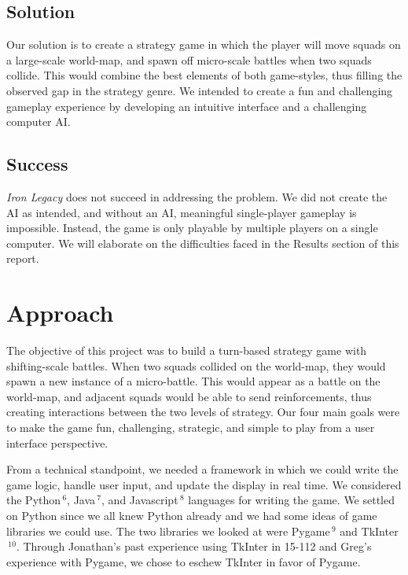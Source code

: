 \documentclass{article}
\begin{document}
\subsection*{Solution}
Our solution is to create a strategy game in which the player will move squads
on a large-scale world-map, and spawn off micro-scale battles when two squads
collide.
This would combine the best elements of both game-styles,
thus filling the observed gap in the strategy genre.
We intended to create a fun and challenging gameplay experience by developing
an intuitive interface and a challenging computer AI.

\subsection*{Success}
\emph{Iron Legacy} does not succeed in addressing the problem.
We did not create the AI as intended, and without an AI, meaningful 
single-player gameplay is impossible.
Instead, the game is only playable by multiple players on a single computer.
We will elaborate on the difficulties faced in the Results section of this
report.

\section*{Approach}
The objective of this project was to build a turn-based strategy game with 
shifting-scale battles.
When two squads collided on the world-map, they would spawn a new instance of
a micro-battle.
This would appear as a battle on the world-map, and adjacent squads would be
able to send reinforcements, thus creating interactions between the two
levels of strategy.
Our four main goals were to make the game fun, challenging, strategic, and 
simple to play from a user interface perspective.

From a technical standpoint, we needed a framework in which we could write the
game logic, handle user input, and update the display in real time.
We considered the Python$\,^6$, Java$\,^7$, and 
Javascript$\,^8$ languages for writing the game. 
We settled on Python since we all knew Python already and we had some ideas of
game libraries we could use.
The two libraries we looked at were Pygame$\,^9$ and 
TkInter$\,^{10}$.
Through Jonathan's past experience using TkInter in 15-112 and Greg's 
experience with Pygame, we chose to eschew TkInter in favor of Pygame.
\end{document}
